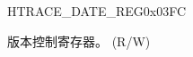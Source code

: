 \begin{register}{H}{TRACE\_DATE\_REG}{0x03FC}\label{regdesc:TRACEDATEREG}
%
%
\regnewline%
\begin{regdesc}\begin{reglist}
\label{fielddesc:TRACEDATE}\item [TRACE\_DATE] 版本控制寄存器。 (R/W)
\end{reglist}\end{regdesc}
\end{register}


